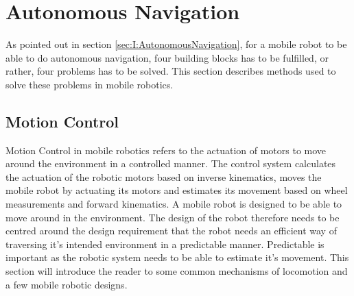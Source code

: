 \section{Autonomous Navigation} \label{sec:T:AutonomousNavigation}
As pointed out in section \ref{sec:I:AutonomousNavigation}, for a mobile robot to be able to do autonomous navigation, four building blocks has to be fulfilled, or rather, four problems has to be solved. This section describes methods used to solve these problems in mobile robotics.


\subsection{Motion Control}\label{sec:T:AN:MotionControl}
Motion Control in mobile robotics refers to the actuation of motors to move  around the environment in a controlled manner. The control system calculates the actuation of the robotic motors based on inverse kinematics, moves the mobile robot by actuating its motors and estimates its movement based on wheel measurements and forward kinematics.
A mobile robot is designed to be able to move around in the environment. The design of the robot therefore needs to be centred around the design requirement that the robot needs an efficient way of traversing it's intended environment in a predictable manner. Predictable is important as the robotic system needs to be able to estimate it's movement. This section will introduce the reader to some common mechanisms of locomotion and a few mobile robotic designs.

